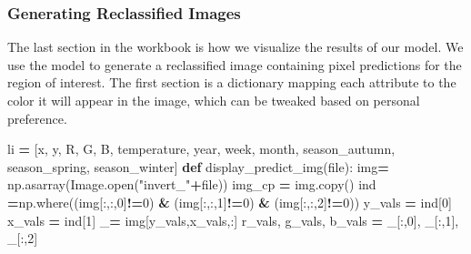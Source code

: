 \documentclass[
]{article}
\newenvironment{Shaded}{\begin{snugshade}}{\end{snugshade}}
\newcommand{\BuiltInTok}[1]{#1}
\newcommand{\DecValTok}[1]{\textcolor[rgb]{0.00,0.00,0.81}{#1}}
\newcommand{\KeywordTok}[1]{\textcolor[rgb]{0.13,0.29,0.53}{\textbf{#1}}}
\newcommand{\NormalTok}[1]{#1}
\newcommand{\OperatorTok}[1]{\textcolor[rgb]{0.81,0.36,0.00}{\textbf{#1}}}
\newcommand{\StringTok}[1]{\textcolor[rgb]{0.31,0.60,0.02}{#1}}
\begin{document}
\hypertarget{generating-reclassified-images}{%
\subsubsection{Generating Reclassified Images}\label{generating-reclassified-images}}

The last section in the workbook is how we visualize the results of our model. We use the model to generate a reclassified image containing pixel predictions for the region of interest. The first section is a dictionary mapping each attribute to the color it will appear in the image, which can be tweaked based on personal preference.

\begin{Shaded}
\begin{Highlighting}[]
\NormalTok{li }\OperatorTok{=}\NormalTok{ [}\StringTok{\textquotesingle{}x\textquotesingle{}}\NormalTok{, }\StringTok{\textquotesingle{}y\textquotesingle{}}\NormalTok{, }\StringTok{\textquotesingle{}R\textquotesingle{}}\NormalTok{, }\StringTok{\textquotesingle{}G\textquotesingle{}}\NormalTok{, }\StringTok{\textquotesingle{}B\textquotesingle{}}\NormalTok{, }\StringTok{\textquotesingle{}temperature\textquotesingle{}}\NormalTok{, }\StringTok{\textquotesingle{}year\textquotesingle{}}\NormalTok{, }\StringTok{\textquotesingle{}week\textquotesingle{}}\NormalTok{, }\StringTok{\textquotesingle{}month\textquotesingle{}}\NormalTok{,}
       \StringTok{\textquotesingle{}season\_autumn\textquotesingle{}}\NormalTok{, }\StringTok{\textquotesingle{}season\_spring\textquotesingle{}}\NormalTok{, }\StringTok{\textquotesingle{}season\_winter\textquotesingle{}}\NormalTok{]}
\KeywordTok{def}\NormalTok{ display\_predict\_img(}\BuiltInTok{file}\NormalTok{):}
\NormalTok{    img}\OperatorTok{=}\NormalTok{ np.asarray(Image.}\BuiltInTok{open}\NormalTok{(}\StringTok{"invert\_"}\OperatorTok{+}\BuiltInTok{file}\NormalTok{))}
\NormalTok{    img\_cp }\OperatorTok{=}\NormalTok{ img.copy()}
\NormalTok{    ind }\OperatorTok{=}\NormalTok{np.where((img[:,:,}\DecValTok{0}\NormalTok{]}\OperatorTok{!=}\DecValTok{0}\NormalTok{) }\OperatorTok{\&}\NormalTok{ (img[:,:,}\DecValTok{1}\NormalTok{]}\OperatorTok{!=}\DecValTok{0}\NormalTok{) }\OperatorTok{\&}\NormalTok{ (img[:,:,}\DecValTok{2}\NormalTok{]}\OperatorTok{!=}\DecValTok{0}\NormalTok{))}
\NormalTok{    y\_vals }\OperatorTok{=}\NormalTok{ ind[}\DecValTok{0}\NormalTok{]}
\NormalTok{    x\_vals }\OperatorTok{=}\NormalTok{ ind[}\DecValTok{1}\NormalTok{]}
\NormalTok{    \_}\OperatorTok{=}\NormalTok{ img[y\_vals,x\_vals,:]}
\NormalTok{    r\_vals, g\_vals, b\_vals }\OperatorTok{=}\NormalTok{ \_[:,}\DecValTok{0}\NormalTok{], \_[:,}\DecValTok{1}\NormalTok{], \_[:,}\DecValTok{2}\NormalTok{]}

\end{Highlighting}
\end{Shaded}
\end{document}
